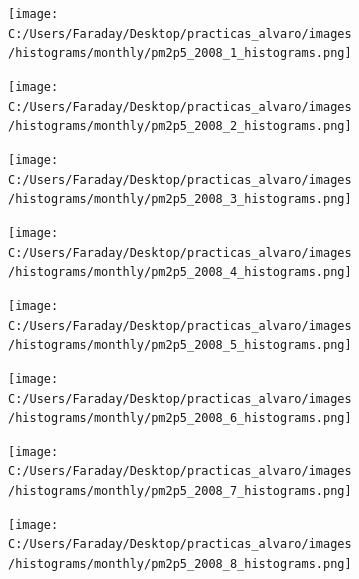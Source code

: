 \documentclass[12pt]{article}
\begin{document}
\newpage

\begin{figure}[H]
\centering
\begin{subfigure}[h]{0.45\textwidth}
\texttt{[image: C:/Users/Faraday/Desktop/practicas\_alvaro/images/histograms/monthly/pm2p5\_2008\_1\_histograms.png]}
\caption{}
\label{fig:hist-mon-4-1-2008}
\end{subfigure}
%
\begin{subfigure}[H]{0.45\textwidth}
\texttt{[image: C:/Users/Faraday/Desktop/practicas\_alvaro/images/histograms/monthly/pm2p5\_2008\_2\_histograms.png]}
\caption{}
\label{fig:hist-mon-4-2-2008}
\end{subfigure}
\caption{}
\end{figure}

\begin{figure}[H]
\centering
\begin{subfigure}[h]{0.45\textwidth}
\texttt{[image: C:/Users/Faraday/Desktop/practicas\_alvaro/images/histograms/monthly/pm2p5\_2008\_3\_histograms.png]}
\caption{}
\label{fig:hist-mon-4-3-2008}
\end{subfigure}
%
\begin{subfigure}[H]{0.45\textwidth}
\texttt{[image: C:/Users/Faraday/Desktop/practicas\_alvaro/images/histograms/monthly/pm2p5\_2008\_4\_histograms.png]}
\caption{}
\label{fig:hist-mon-4-4-2008}
\end{subfigure}
\caption{}
\end{figure}

\begin{figure}[H]
\centering
\begin{subfigure}[h]{0.45\textwidth}
\texttt{[image: C:/Users/Faraday/Desktop/practicas\_alvaro/images/histograms/monthly/pm2p5\_2008\_5\_histograms.png]}
\caption{}
\label{fig:hist-mon-4-5-2008}
\end{subfigure}
%
\begin{subfigure}[H]{0.45\textwidth}
\texttt{[image: C:/Users/Faraday/Desktop/practicas\_alvaro/images/histograms/monthly/pm2p5\_2008\_6\_histograms.png]}
\caption{}
\label{fig:hist-mon-4-6-2008}
\end{subfigure}
\caption{}
\end{figure}

\newpage

\begin{figure}[H]
\centering
\begin{subfigure}[h]{0.45\textwidth}
\texttt{[image: C:/Users/Faraday/Desktop/practicas\_alvaro/images/histograms/monthly/pm2p5\_2008\_7\_histograms.png]}
\caption{}
\label{fig:hist-mon-4-7-2008}
\end{subfigure}
%
\begin{subfigure}[H]{0.45\textwidth}
\texttt{[image: C:/Users/Faraday/Desktop/practicas\_alvaro/images/histograms/monthly/pm2p5\_2008\_8\_histograms.png]}
\caption{}
\label{fig:hist-mon-4-8-2008}
\end{subfigure}
\caption{}
\end{figure}
\end{document}
